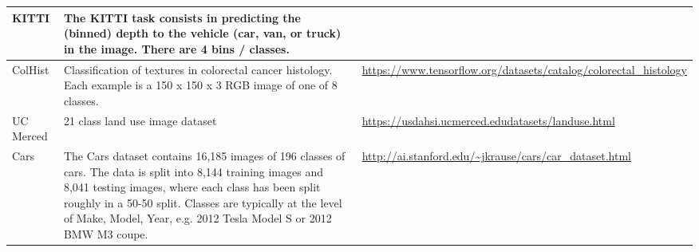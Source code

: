 \begin{table}[ht]
{{\begin{tabular}{l p{12cm} p{5cm}}
        KITTI & The KITTI task consists in predicting the (binned) depth to the vehicle (car, van, or truck) in the image. There are 4 bins / classes. &~\citep{geiger2013vision}\\ \midrule
        ColHist & Classification of textures in colorectal cancer histology. Each example is a 150 x 150 x 3 RGB image of one of 8 classes. & \url{https://www.tensorflow.org/datasets/catalog/colorectal_histology} \\ \midrule
        UC Merced & 21 class land use image dataset & \url{https://usdahsi.ucmerced.edudatasets/landuse.html} \\
        \midrule
        Cars &  The Cars dataset contains 16,185 images of 196 classes of cars. The data is split into 8,144 training images and 8,041 testing images, where each class has been split roughly in a 50-50 split. Classes are typically at the level of Make, Model, Year, e.g. 2012 Tesla Model S or 2012 BMW M3 coupe.& \url{http://ai.stanford.edu/~jkrause/cars/car_dataset.html} \\ \bottomrule

    \end{tabular}
    }}
    \label{table:fewshot_datasets}
\end{table}

\clearpage
\newpage